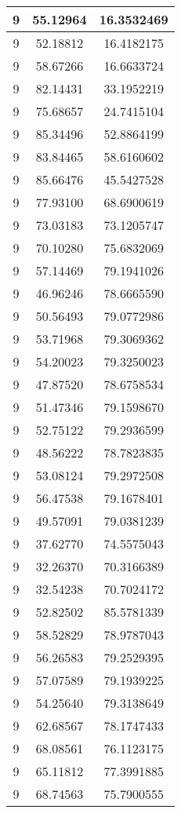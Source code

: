 \documentclass[
]{book}
\begin{document}
\begin{tabular}{c|c|c}
\hline
9 & 55.12964 & 16.3532469\\
\hline
9 & 52.18812 & 16.4182175\\
\hline
9 & 58.67266 & 16.6633724\\
\hline
9 & 82.14431 & 33.1952219\\
\hline
9 & 75.68657 & 24.7415104\\
\hline
9 & 85.34496 & 52.8864199\\
\hline
9 & 83.84465 & 58.6160602\\
\hline
9 & 85.66476 & 45.5427528\\
\hline
9 & 77.93100 & 68.6900619\\
\hline
9 & 73.03183 & 73.1205747\\
\hline
9 & 70.10280 & 75.6832069\\
\hline
9 & 57.14469 & 79.1941026\\
\hline
9 & 46.96246 & 78.6665590\\
\hline
9 & 50.56493 & 79.0772986\\
\hline
9 & 53.71968 & 79.3069362\\
\hline
9 & 54.20023 & 79.3250023\\
\hline
9 & 47.87520 & 78.6758534\\
\hline
9 & 51.47346 & 79.1598670\\
\hline
9 & 52.75122 & 79.2936599\\
\hline
9 & 48.56222 & 78.7823835\\
\hline
9 & 53.08124 & 79.2972508\\
\hline
9 & 56.47538 & 79.1678401\\
\hline
9 & 49.57091 & 79.0381239\\
\hline
9 & 37.62770 & 74.5575043\\
\hline
9 & 32.26370 & 70.3166389\\
\hline
9 & 32.54238 & 70.7024172\\
\hline
9 & 52.82502 & 85.5781339\\
\hline
9 & 58.52829 & 78.9787043\\
\hline
9 & 56.26583 & 79.2529395\\
\hline
9 & 57.07589 & 79.1939225\\
\hline
9 & 54.25640 & 79.3138649\\
\hline
9 & 62.68567 & 78.1747433\\
\hline
9 & 68.08561 & 76.1123175\\
\hline
9 & 65.11812 & 77.3991885\\
\hline
9 & 68.74563 & 75.7900555\\

\end{tabular}
\end{document}
